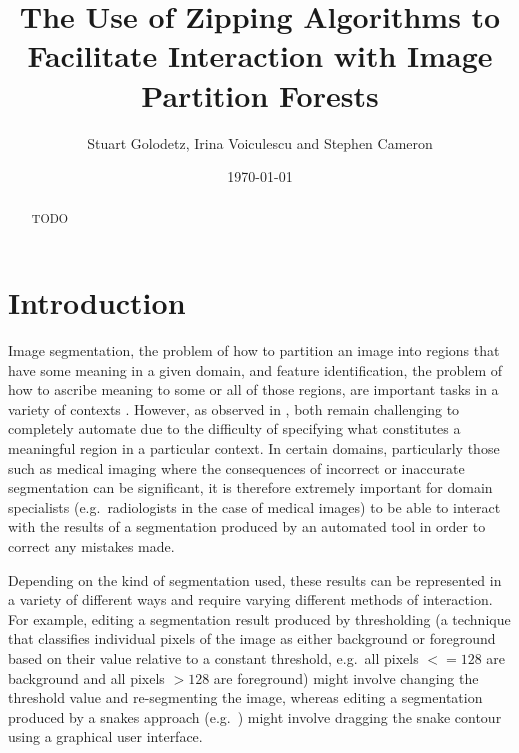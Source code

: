 \documentclass[a4paper]{article}
\begin{document}
\title{The Use of Zipping Algorithms to Facilitate Interaction with Image Partition Forests}
\author{Stuart Golodetz, Irina Voiculescu and Stephen Cameron}
\date{\today}
\maketitle

\begin{abstract}
\noindent TODO
\end{abstract}

\section{Introduction}


Image segmentation, the problem of how to partition an image into regions that have some meaning in a given domain, and feature identification, the problem of how to ascribe meaning to some or all of those regions, are important tasks in a variety of contexts \cite{?}. However, as observed in \cite{golodetz11}, both remain challenging to completely automate due to the difficulty of specifying what constitutes a meaningful region in a particular context. In certain domains, particularly those such as medical imaging where the consequences of incorrect or inaccurate segmentation can be significant, it is therefore extremely important for domain specialists (e.g.~radiologists in the case of medical images) to be able to interact with the results of a segmentation produced by an automated tool in order to correct any mistakes made.

Depending on the kind of segmentation used\footnotemark, these results can be represented in a variety of different ways and require varying different methods of interaction. For example, editing a segmentation result produced by thresholding (a technique that classifies individual pixels of the image as either background or foreground based on their value relative to a constant threshold, e.g.~all pixels $<= 128$ are background and all pixels $> 128$ are foreground) might involve changing the threshold value and re-segmenting the image, whereas editing a segmentation produced by a snakes approach (e.g.~\cite{?}) might involve dragging the snake contour using a graphical user interface.

\end{document}
